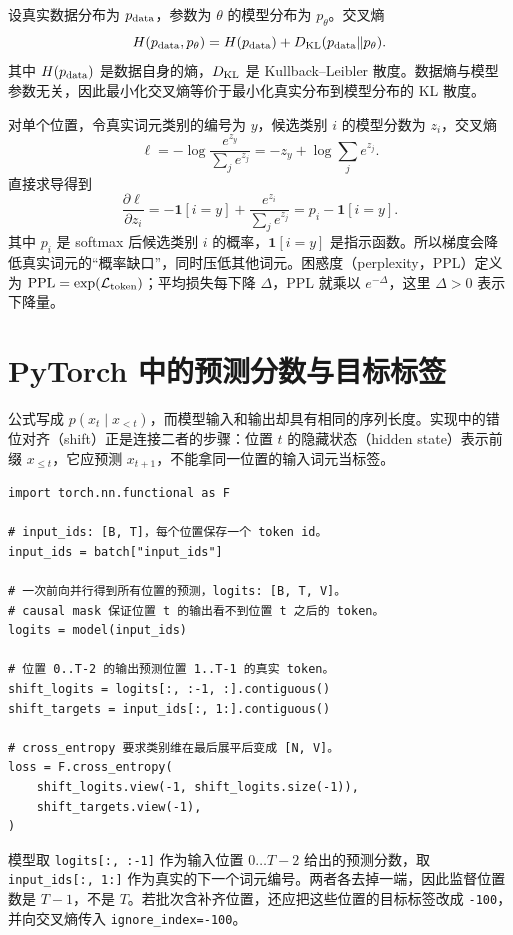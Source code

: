 \begin{mathbox}
设真实数据分布为 $p_{\rm data}$，参数为 $\theta$ 的模型分布为 $p_\theta$。交叉熵
\[
H(p_{\rm data},p_\theta)=H(p_{\rm data})+D_{\rm KL}(p_{\rm data}\Vert p_\theta).
\]
其中 $H(p_{\rm data})$ 是数据自身的熵，$D_{\rm KL}$ 是 Kullback--Leibler 散度。数据熵与模型参数无关，因此最小化交叉熵等价于最小化真实分布到模型分布的 KL 散度。
\end{mathbox}

\begin{mathbox}
对单个位置，令真实词元类别的编号为 $y$，候选类别 $i$ 的模型分数为 $z_i$，交叉熵
\[
\ell=-\log\frac{e^{z_y}}{\sum_j e^{z_j}}
=-z_y+\log\sum_j e^{z_j}.
\]
直接求导得到
\[
\frac{\partial\ell}{\partial z_i}
=-\mathbf 1[i=y]+\frac{e^{z_i}}{\sum_j e^{z_j}}
=p_i-\mathbf 1[i=y].
\]
其中 $p_i$ 是 softmax 后候选类别 $i$ 的概率，$\mathbf 1[i=y]$ 是指示函数。所以梯度会降低真实词元的“概率缺口”，同时压低其他词元。困惑度（perplexity，PPL）定义为
$\operatorname{PPL}=\exp(\mathcal L_{\rm token})$；平均损失每下降 $\Delta$，PPL 就乘以 $e^{-\Delta}$，这里 $\Delta>0$ 表示下降量。
\end{mathbox}

\section{PyTorch 中的预测分数与目标标签}

公式写成 $p(x_t\mid x_{<t})$，而模型输入和输出却具有相同的序列长度。实现中的错位对齐（shift）正是连接二者的步骤：位置 $t$ 的隐藏状态（hidden state）表示前缀 $x_{\le t}$，它应预测 $x_{t+1}$，不能拿同一位置的输入词元当标签。

\begin{lstlisting}
import torch.nn.functional as F

# input_ids: [B, T]，每个位置保存一个 token id。
input_ids = batch["input_ids"]

# 一次前向并行得到所有位置的预测，logits: [B, T, V]。
# causal mask 保证位置 t 的输出看不到位置 t 之后的 token。
logits = model(input_ids)

# 位置 0..T-2 的输出预测位置 1..T-1 的真实 token。
shift_logits = logits[:, :-1, :].contiguous()
shift_targets = input_ids[:, 1:].contiguous()

# cross_entropy 要求类别维在最后展平后变成 [N, V]。
loss = F.cross_entropy(
    shift_logits.view(-1, shift_logits.size(-1)),
    shift_targets.view(-1),
)
\end{lstlisting}

模型取 {\small\texttt{logits[:, :-1]}} 作为输入位置 $0\ldots T-2$ 给出的预测分数，取 {\small\texttt{input\_ids[:, 1:]}} 作为真实的下一个词元编号。两者各去掉一端，因此监督位置数是 $T-1$，不是 $T$。若批次含补齐位置，还应把这些位置的目标标签改成 \texttt{-100}，并向交叉熵传入 \texttt{ignore\_index=-100}。

